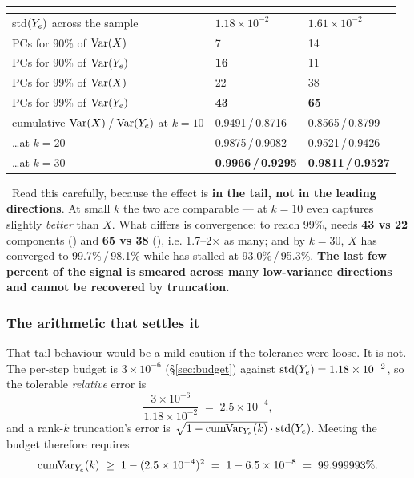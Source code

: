 \begin{center}
\begin{tabularx}{\textwidth}{@{}Y L{3.2cm} L{3.2cm}@{}}
\toprule
 & \textbf{} & \textbf{} \\
\midrule
std$(Y_{e})$ across the sample & $1.18\times10^{-2}$ & $1.61\times10^{-2}$ \\
PCs for 90\% of \textbf{$\operatorname*{Var}(X)$} & 7 & 14 \\
PCs for 90\% of \textbf{$\operatorname*{Var}(Y_{e})$} & \textbf{16} & 11 \\
PCs for 99\% of $\operatorname*{Var}(X)$ & 22 & 38 \\
PCs for 99\% of \textbf{$\operatorname*{Var}(Y_{e})$} & \textbf{43} & \textbf{65} \\
cumulative $\operatorname*{Var}(X)$\,/\,$\operatorname*{Var}(Y_{e})$ at $k = 10$ &
  0.9491\,/\,0.8716 & 0.8565\,/\,0.8799 \\
\ldots at $k = 20$ & 0.9875\,/\,0.9082 & 0.9521\,/\,0.9426 \\
\ldots at $k = 30$ & \textbf{0.9966\,/\,0.9295} &
  \textbf{0.9811\,/\,0.9527} \\
\bottomrule
\end{tabularx}
\end{center}

\begin{warn}
\warnglyph{}~Read this carefully, because the effect is \textbf{in the tail, not
in the leading directions}. At small $k$ the two are comparable ---  at
$k = 10$ even captures \Ye{} slightly \emph{better} than $X$. What differs is
convergence: to reach 99\%, \Ye{} needs \textbf{43 vs 22} components ()
and \textbf{65 vs 38} (), i.e. 1.7--2$\times$ as many; and by $k = 30$,
$X$ has converged to 99.7\%\,/\,98.1\% while \Ye{} has stalled at
93.0\%\,/\,95.3\%. \textbf{The last few percent of the \Ye{} signal is smeared
across many low-variance directions and cannot be recovered by truncation.}
\end{warn}

\subsubsection{The arithmetic that settles it}
\label{sec:effdim-arithmetic}

That tail behaviour would be a mild caution if the \Ye{} tolerance were loose.
It is not. The per-step budget is $3\times10^{-6}$ (\S\ref{sec:budget}) against
$\mathrm{std}(Y_{e}) = 1.18\times10^{-2}$, so the tolerable \emph{relative} error
is
%
\begin{equation}
\frac{3\times10^{-6}}{1.18\times10^{-2}} \;=\; 2.5\times10^{-4},
\label{eq:reltol}
\end{equation}
%
and a rank-$k$ truncation's \Ye{} error is
$\sqrt{1 - \mathrm{cumVar}_{Y_{e}}(k)}\cdot\mathrm{std}(Y_{e})$. Meeting the budget
therefore requires
%
\begin{equation}
\mathrm{cumVar}_{Y_{e}}(k) \;\ge\; 1 - (2.5\times10^{-4})^2
\;=\; 1 - 6.5\times10^{-8} \;=\; 99.999993\% .
\label{eq:cumvarreq}
\end{equation}
\derivedhere

